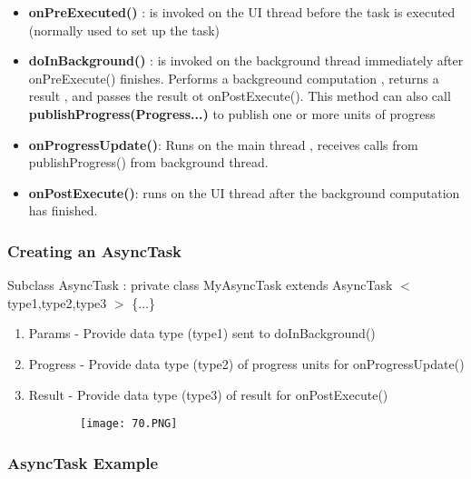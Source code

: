 \documentclass{article}
\begin{document}
\begin{itemize}
    \item \textbf{onPreExecuted()} : is invoked on the UI thread before the task is executed (normally used to set up the task)
     \item \textbf{doInBackground()} : is invoked on the background thread immediately after onPreExecute() finishes. Performs a backgreound computation , returns a result , and passes the result ot onPostExecute(). This method can also call \textbf{publishProgress(Progress...)} to publish one or more units of progress
      \item \textbf{onProgressUpdate()}: Runs on the main thread , receives calls from publishProgress() from background thread.
    \item \textbf{onPostExecute()}: runs on the UI thread after the background computation has finished.

\end{itemize}

\subsubsection{Creating an AsyncTask}

Subclass AsyncTask : private class MyAsyncTask extends AsyncTask $<$ type1,type2,type3 $>$ \{...\}

\begin{enumerate}
    \item Params - Provide data type (type1) sent to doInBackground()
    \item Progress - Provide data type (type2) of progress units for onProgressUpdate()
    \item Result - Provide data type (type3) of result for onPostExecute()
\end{enumerate}

  \begin{figure}[ht!]
  \centering
  \begin{subfigure}[b]{.7\linewidth}
  \texttt{[image: 70.PNG]}
  \end{subfigure}
  \end{figure}

\vspace{50mm}

  \subsubsection{AsyncTask Example}
\end{document}
